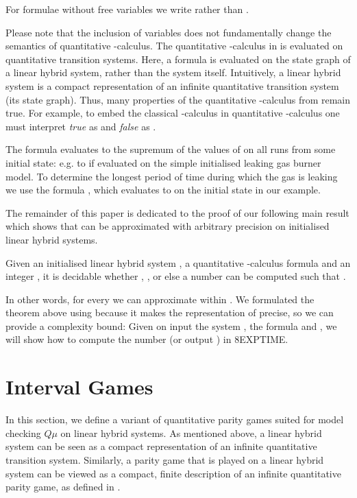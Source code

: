 \documentclass[fleqn,envcountsame]{LMCS}
\newcommand{\muc}{-calculus\xspace}
\newcommand{\qmu}{quantitative \muc}
\newcommand{\Qmu}{\ensuremath{Q\mu}\xspace}
\begin{document}
\noindent For formulae without free variables we write 
rather than .

Please note that the inclusion of variables does not fundamentally 
change the semantics of \qmu. The \qmu in \cite{FGK10} is evaluated
on quantitative transition systems. Here, a formula is evaluated on
the state graph of a linear hybrid system, rather than the system itself.
Intuitively, a linear hybrid system is a compact representation
of an infinite quantitative transition system (its state graph).
Thus, many properties of the \qmu from \cite{FGK10} remain true.
For example, to embed the classical -calculus in \qmu one must
interpret \emph{true} as  and \emph{false} as .

\begin{exa}
The formula  evaluates to the supremum of
the values of  on all runs from some initial state:
e.g. to  if evaluated on the simple initialised
leaking gas burner model. To determine the longest period of time
during which the gas is leaking we use the formula
, which evaluates to  on
the initial state  in our example.
\end{exa}


The remainder of this paper is dedicated to the proof of our following
main result which shows that  can be approximated
with arbitrary precision on initialised linear hybrid systems.

\begin{thm} \label{mainthm}
Given an initialised linear hybrid system , a \qmu formula 
and an integer , it is decidable whether ,
, or else a number  can be computed
such that .
\end{thm}

In other words, for every  we can approximate 
within . We formulated the theorem above using  because it
makes the representation of  precise, so we can provide a complexity
bound: Given on input the system , the formula  and , we will
show how to compute the number  (or output ) in \textsc{8EXPTIME}.


\section{Interval Games}\label{sec_ipg}

In this section, we define a variant of quantitative parity games
suited for model checking \Qmu on linear hybrid systems.
As mentioned above, a linear hybrid system can be seen as a compact 
representation of an infinite quantitative transition system. 
Similarly, a parity game that is played on a linear hybrid
system can be viewed as a compact, finite description of an
infinite quantitative parity game, as defined in \cite{FGK10}.
\end{document}
